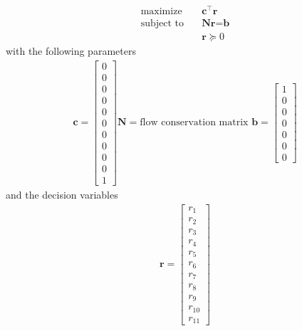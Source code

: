 \documentclass[11pt]{article}
\begin{document}
\begin{align*}
  \text{maximize} & \quad \textbf{c}^\top \textbf{r} \\
  \text{subject to} & \quad \textbf{N} \textbf{r} = \textbf{b} \\
  & \quad \textbf{r} \succeq 0
\end{align*}
with the following parameters
\begin{align*}
  \textbf{c} = 
    \begin{bmatrix}
      0 \\ 0 \\ 0 \\ 0 \\ 0 \\ 0 \\ 0 \\ 0 \\ 0 \\ 0 \\ 1
    \end{bmatrix}
    \textbf{N} = 
    \text{flow conservation matrix }
    \textbf{b} = 
    \begin{bmatrix}
      1 \\ 0 \\ 0 \\ 0 \\ 0 \\ 0 \\ 0
    \end{bmatrix}
\end{align*}
and the decision variables
\begin{align*}
  \textbf{r} = 
  \begin{bmatrix}
     r_1 \\ r_2 \\ r_3 \\ r_4 \\ r_5 \\ r_6 \\ r_7 \\ r_8 \\ r_9 \\ r_{10} \\ r_{11}
  \end{bmatrix}
\end{align*} 
\end{document}
